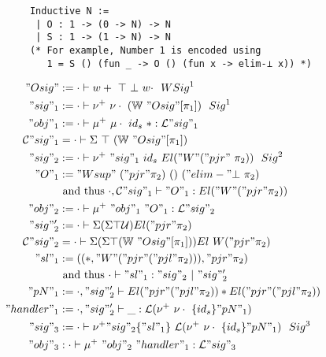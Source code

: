 \begin{figure}
  \begin{minipage}{\linewidth}
    \begin{verbatim}
      Inductive N :=
       | O : 1 -> (0 -> N) -> N 
       | S : 1 -> (1 -> N) -> N
      (* For example, Number 1 is encoded using
         1 = S () (fun _ -> O () (fun x -> elim-⊥ x)) *)
    \end{verbatim}
  \end{minipage}

  \begin{minipage}[t]{0.4\linewidth}
\begin{align*}
  "Osig" &:= \goodWSig{\cdot}{w+ \ \top \ \bot \  w\cdot}{1} \\
  "sig"_1 &:= \goodSig{\cdot}{\nu^+ \ \nu\cdot  \ (\bW \ "Osig"[\pi_1])}{1}  \\
  "obj"_1 &:= \goodTerm{\cdot}{\mu^+ \ \mu\cdot \ {id_s} \ *}{\cL"sig"_1}\\
  \cC"sig"_1 &= \goodType{\cdot}{\Sigma \ \top \ (\bW \ "Osig"[\pi_1]) }{} \\
  "sig"_2 &:=  \goodSig{\cdot}{\nu^+ \ "sig"_1 \ {id_s} \ El ("W" ("pjr" \ \pi_2))}{2} \\ 
  "O"_1 &:= {"Wsup" \ ("pjr" \pi_2) \ () \ ("elim-"\bot \ \pi_2)}  \\ 
  & \text{ and thus }  \goodTerm{\cdot, \cC"sig"_1}{"O"_1}{El ("W" ("pjr" \pi_2))} \\
  "obj"_2 &:= \goodTerm{\cdot}{\mu^+ \ "obj"_1 \ "O"_1}{\cL"sig"_2} \\
  "sig"_2' &:= \goodType{\cdot}{\Sigma (\Sigma \top \cU)El ("pjr" \pi_2)}{} \\ 
  \cC"sig"_2 &= \goodType{\cdot}{\Sigma (\Sigma \top (\bW \ "Osig"[\pi_1]))El \ W("pjr" \pi_2) }{} \\ 
  "sl"_1 &:= ((*, "W" ("pjr" ("pjl" \pi_2)) ), "pjr" \pi_2) \\ 
  & \text{ and thus }  \goodSeal{\cdot}{"sl"_1}{"sig"_2}{"sig"_2'} \\
  "pN"_1 &:= \goodType{\cdot, "sig"_2'}{El ("pjr" ("pjl" \pi_2)) * El ("pjr" ("pjl" \pi_2))}{} \\
  "handler"_1 & := \goodTerm{\cdot, "sig"_2'}{\_}{\cL(\nu^+ \ \nu\cdot \ \{id_s\} "pN"_1)} \\
  "sig"_3 &:= \goodSig{\cdot}{\nu^+ "sig"_2 \{"sl"_1\} \ \cL(\nu^+ \ \nu\cdot \ \{id_s\} "pN"_1)}{3} \\ 
  "obj"_3 &: \goodTerm{\cdot}{\mu^+~"obj"_2~"handler"_1}{\cL"sig"_3}\\

\end{align*}
\end{minipage}
\end{figure}
